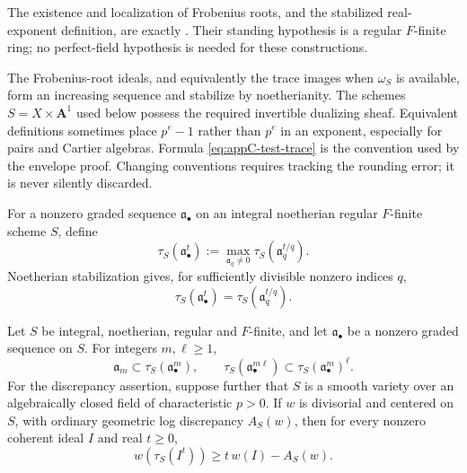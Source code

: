 The existence and localization of Frobenius roots, and the stabilized
real-exponent definition, are exactly
\cite[Definition~2.2, Proposition~2.5, Lemma~2.7 and Definition~2.9]
{BMS08}.  Their standing hypothesis is a regular \(F\)-finite ring;
no perfect-field hypothesis is needed for these constructions.

\begin{remark}[Conventions]
\label{rem:appC-test-rounding-conventions}
The Frobenius-root ideals, and equivalently the trace images when
\(\omega_S\) is available, form an increasing sequence and stabilize by
noetherianity.  The schemes \(S=X\times\mathbf A^1\) used below possess
the required invertible dualizing sheaf.
Equivalent definitions sometimes place \(p^e-1\) rather than \(p^e\) in
an exponent, especially for pairs and Cartier algebras.  Formula
\eqref{eq:appC-test-trace} is the convention used by the envelope proof.
Changing conventions requires tracking the rounding error; it is never
silently discarded.
\end{remark}

\begin{definition}
\label{def:appC-asymptotic-test}
For a nonzero graded sequence \(\mathfrak a_\bullet\) on an integral
noetherian regular \(F\)-finite scheme \(S\), define
\[
 \tau_S(\mathfrak a_\bullet^t)
 :=\max_{\mathfrak a_q\ne0}\tau_S(\mathfrak a_q^{t/q}).
\tag{C.21}\label{eq:appC-asymptotic-test}
\]
Noetherian stabilization gives, for sufficiently divisible nonzero
indices \(q\),
\[
 \tau_S(\mathfrak a_\bullet^t)
 =\tau_S(\mathfrak a_q^{t/q}).
\tag{C.22}\label{eq:appC-test-stabilization}
\]
\end{definition}

\begin{theorem}\label{thm:appC-test-properties}
Let \(S\) be integral, noetherian, regular and \(F\)-finite, and let
\(\mathfrak a_\bullet\) be a nonzero graded sequence on \(S\).
For integers \(m,\ell\geq1\),
\[
 \mathfrak a_m\subset\tau_S(\mathfrak a_\bullet^m),
\qquad
 \tau_S(\mathfrak a_\bullet^{m\ell})
 \subset\tau_S(\mathfrak a_\bullet^m)^\ell.
\tag{C.23}\label{eq:appC-test-subadditivity}
\]
For the discrepancy assertion, suppose further that \(S\) is a smooth
variety over an algebraically closed field of characteristic \(p>0\).
If \(w\) is divisorial and centered on \(S\), with ordinary geometric
log discrepancy \(A_S(w)\), then for every nonzero coherent ideal
\(I\) and real \(t\geq0\),
\[
 w(\tau_S(I^t))
 \geq t\,w(I)-A_S(w).
\tag{C.24}\label{eq:appC-test-discrepancy}
\]
\end{theorem}

